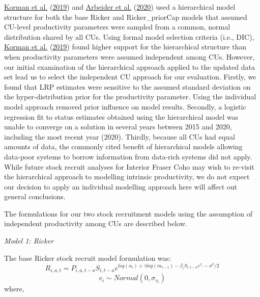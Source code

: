 \documentclass[11pt]{book}
\begin{document}
\protect\hyperlink{ref-kormanEvaluationFrameworkAssessing2019}{Korman et al.} (\protect\hyperlink{ref-kormanEvaluationFrameworkAssessing2019}{2019}) and \protect\hyperlink{ref-arbeiderInteriorFraserCoho2020}{Arbeider et al.} (\protect\hyperlink{ref-arbeiderInteriorFraserCoho2020}{2020}) used a hierarchical model structure for both the base Ricker and Ricker\_priorCap models that assumed CU-level productivity parameters were sampled from a common, normal distribution shared by all CUs. Using formal model selection criteria (i.e., DIC), \protect\hyperlink{ref-kormanEvaluationFrameworkAssessing2019}{Korman et al.} (\protect\hyperlink{ref-kormanEvaluationFrameworkAssessing2019}{2019}) found higher support for the hierarchical structure than when productivity parameters were assumed independent among CUs. However, our initial examination of the hierarchical approach applied to the updated data set lead us to select the independent CU approach for our evaluation. Firstly, we found that LRP estimates were sensitive to the assumed standard deviation on the hyper-distribution prior for the productivity parameter. Using the individual model approach removed prior influence on model results. Secondly, a logistic regression fit to status estimates obtained using the hierarchical model was unable to converge on a solution in several years between 2015 and 2020, including the most recent year (2020). Thirdly, because all CUs had equal amounts of data, the commonly cited benefit of hierarchical models allowing data-poor systems to borrow information from data-rich systems did not apply. While future stock recruit analyses for Interior Fraser Coho may wish to re-visit the hierarchical approach to modelling intrinsic productivity, we do not expect our decision to apply an individual modelling approach here will affect out general conclusions.

The formulations for our two stock recruitment models using the assumption of independent productivity among CUs are described below.

\emph{Model 1: Ricker}

The base Ricker stock recruit model formulation was:
\begin{equation}
  R_{i,a,t} = P_{i,a,t-a}S_{i,t-a}e^{log(\alpha_i) + \gamma log(m_{t-1})-\beta_i S_{i,t-a}e^{v_i}-\sigma^2/2}
   \label{eq:rickerSurv-IM}
\end{equation} \begin{equation}
  v_i \sim Normal(0,\sigma_{v_i})
\end{equation}
where,
\end{document}
